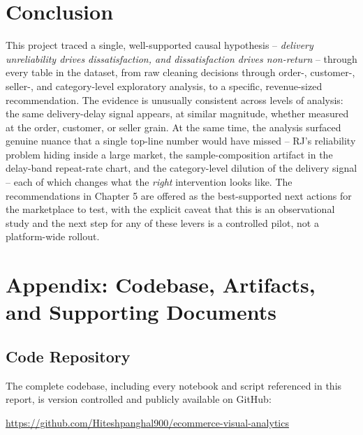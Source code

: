 \documentclass[11pt,a4paper]{report}
\begin{document}
\chapter{Conclusion}

This project traced a single, well-supported causal hypothesis -- \emph{delivery unreliability
drives dissatisfaction, and dissatisfaction drives non-return} -- through every table in the
dataset, from raw cleaning decisions through order-, customer-, seller-, and category-level
exploratory analysis, to a specific, revenue-sized recommendation. The evidence is unusually
consistent across levels of analysis: the same delivery-delay signal appears, at similar
magnitude, whether measured at the order, customer, or seller grain. At the same time, the
analysis surfaced genuine nuance that a single top-line number would have missed -- RJ's reliability
problem hiding inside a large market, the sample-composition artifact in the delay-band repeat-rate
chart, and the category-level dilution of the delivery signal -- each of which changes what the
\emph{right} intervention looks like. The recommendations in Chapter 5 are offered as the
best-supported next actions for the marketplace to test, with the explicit caveat that this is an
observational study and the next step for any of these levers is a controlled pilot, not a
platform-wide rollout.

\clearpage

\appendix
\chapter{Appendix: Codebase, Artifacts, and Supporting Documents}

\section{Code Repository}
The complete codebase, including every notebook and script referenced in this report, is version
controlled and publicly available on GitHub:

\begin{center}
\url{https://github.com/Hiteshpanghal900/ecommerce-visual-analytics}
\end{center}
\end{document}
